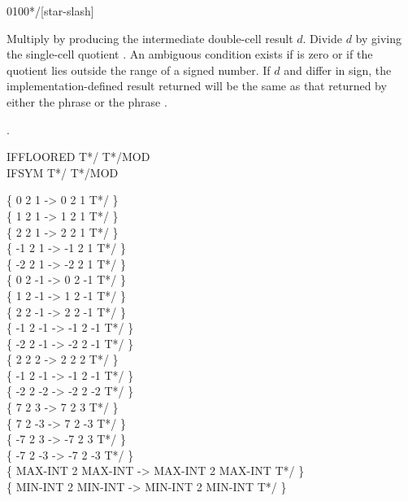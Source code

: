 \begin{worddef}{0100}{*/}[star-slash]
\item {}

	Multiply  by  producing the intermediate
	double-cell result $d$. Divide $d$ by  giving the
	single-cell quotient . An ambiguous condition exists
	if  is zero or if the quotient  lies
	outside the range of a signed number. If $d$ and 
	differ in sign, the implementation-defined result returned will
	be the same as that returned by either the phrase
	     
	or the phrase
	     .

\see {}.

	\begin{defer}
	\testing
		IFFLOORED \tab	\word{:} T*/ T*/MOD   \word{;} \\
		IFSYM \tab[2.6]	\word{:} T*/ T*/MOD   \word{;}

		\{       0 2       1 \word{*/} ->       0 2       1 T*/ \} \\
		\{       1 2       1 \word{*/} ->       1 2       1 T*/ \} \\
		\{       2 2       1 \word{*/} ->       2 2       1 T*/ \} \\
		\{      -1 2       1 \word{*/} ->      -1 2       1 T*/ \} \\
		\{      -2 2       1 \word{*/} ->      -2 2       1 T*/ \} \\
		\{       0 2      -1 \word{*/} ->       0 2      -1 T*/ \} \\
		\{       1 2      -1 \word{*/} ->       1 2      -1 T*/ \} \\
		\{       2 2      -1 \word{*/} ->       2 2      -1 T*/ \} \\
		\{      -1 2      -1 \word{*/} ->      -1 2      -1 T*/ \} \\
		\{      -2 2      -1 \word{*/} ->      -2 2      -1 T*/ \} \\
		\{       2 2       2 \word{*/} ->       2 2       2 T*/ \} \\
		\{      -1 2      -1 \word{*/} ->      -1 2      -1 T*/ \} \\
		\{      -2 2      -2 \word{*/} ->      -2 2      -2 T*/ \} \\
		\{       7 2       3 \word{*/} ->       7 2       3 T*/ \} \\
		\{       7 2      -3 \word{*/} ->       7 2      -3 T*/ \} \\
		\{      -7 2       3 \word{*/} ->      -7 2       3 T*/ \} \\
		\{      -7 2      -3 \word{*/} ->      -7 2      -3 T*/ \} \\
		\{ MAX-INT 2 MAX-INT \word{*/} -> MAX-INT 2 MAX-INT T*/ \} \\
		\{ MIN-INT 2 MIN-INT \word{*/} -> MIN-INT 2 MIN-INT T*/ \}
	\end{defer}
\end{worddef}


